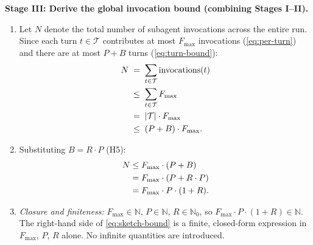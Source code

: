 \documentclass[12pt]{article}
\theoremstyle{definition}
\begin{document}
\medskip
\noindent\textbf{Stage III: Derive the global invocation bound
(combining Stages I--II).}
\begin{enumerate}
    \item[III.1] Let $N$ denote the total number of subagent invocations
                 across the entire run.  Since each turn $t \in \mathcal{T}$
                 contributes at most $F_{\max}$ invocations
                 (\eqref{eq:per-turn}) and there are at most $P + B$ turns
                 (\eqref{eq:turn-bound}):
                 \begin{align}
                     N
                     \;&=\; \sum_{t \in \mathcal{T}} \text{invocations}(t)
                     \notag\\
                     \;&\leq\; \sum_{t \in \mathcal{T}} F_{\max}
                     \notag\\
                     \;&=\; |\mathcal{T}| \cdot F_{\max}
                     \notag\\
                     \;&\leq\; (P + B) \cdot F_{\max}.
                     \label{eq:N-pre}
                 \end{align}
    \item[III.2] Substituting $B = R \cdot P$ (H5):
                 \begin{align}
                     N
                     &\leq F_{\max} \cdot (P + B) \notag\\
                     &= F_{\max} \cdot (P + R \cdot P) \notag\\
                     &= F_{\max} \cdot P \cdot (1 + R).
                     \label{eq:sketch-bound}
                 \end{align}
    \item[III.3] \emph{Closure and finiteness:}
                 $F_{\max} \in \mathbb{N}$, $P \in \mathbb{N}$,
                 $R \in \mathbb{N}_{0}$, so
                 $F_{\max} \cdot P \cdot (1+R) \in \mathbb{N}$.
                 The right-hand side of \eqref{eq:sketch-bound} is a
                 finite, closed-form expression in $F_{\max}$, $P$, $R$
                 alone.  No infinite quantities are introduced.
\end{enumerate}
\end{document}
